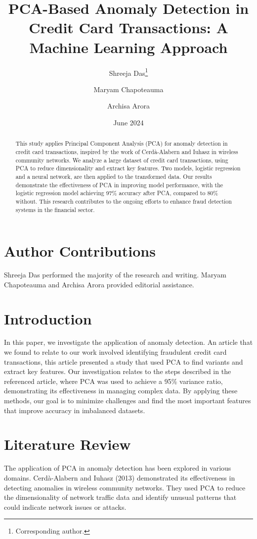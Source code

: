 \documentclass{article}
\title{PCA-Based Anomaly Detection in Credit Card Transactions: A Machine Learning Approach}
\author{Shreeja Das\thanks{Corresponding author.} \and Maryam Chapoteauma \and Archisa Arora}
\date{June 2024}
\begin{document}
\maketitle

\section*{Author Contributions}
Shreeja Das performed the majority of the research and writing. Maryam Chapoteauma and Archisa Arora provided editorial assistance.

\begin{abstract}
This study applies Principal Component Analysis (PCA) for anomaly detection in credit card transactions, inspired by the work of Cerdà-Alabern and Iuhasz in wireless community networks. We analyze a large dataset of credit card transactions, using PCA to reduce dimensionality and extract key features. Two models, logistic regression and a neural network, are then applied to the transformed data. Our results demonstrate the effectiveness of PCA in improving model performance, with the logistic regression model achieving 97\% accuracy after PCA, compared to 80\% without. This research contributes to the ongoing efforts to enhance fraud detection systems in the financial sector.
\end{abstract}

\section{Introduction}
In this paper, we investigate the application of anomaly detection. An article that we found to relate to our work involved identifying fraudulent credit card transactions, this article presented a study that used PCA to find variants and extract key features. Our investigation relates to the steps described in the referenced article, where PCA was used to achieve a 95\% variance ratio, demonstrating its effectiveness in managing complex data. By applying these methods, our goal is to minimize challenges and find the most important features that improve accuracy in imbalanced datasets.

\section{Literature Review}
The application of PCA in anomaly detection has been explored in various domains. Cerdà-Alabern and Iuhasz (2013) demonstrated its effectiveness in detecting anomalies in wireless community networks. They used PCA to reduce the dimensionality of network traffic data and identify unusual patterns that could indicate network issues or attacks.
\end{document}
